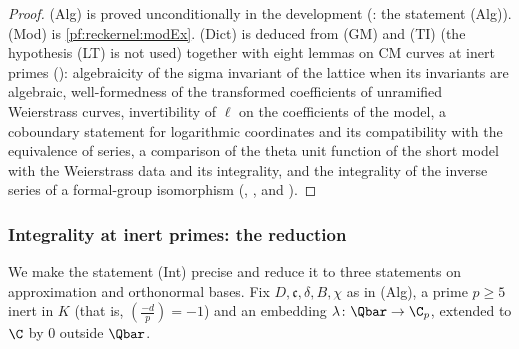 \begin{proof}
(Alg) is proved unconditionally in the development (: the statement (Alg)).
(Mod) is \cref{pf:reckernel:modEx}. (Dict) is deduced from (GM) and (TI) (the hypothesis (LT) is not used) together with eight lemmas on CM curves at
inert primes (): algebraicity of the sigma invariant of
the lattice when its invariants are algebraic, well-formedness of the transformed coefficients of unramified
Weierstrass curves, invertibility of $\ell$ on the coefficients of the model, a coboundary statement for logarithmic
coordinates and its compatibility with the equivalence of series, a comparison of the theta unit function of the short
model with the Weierstrass data and its integrality, and the integrality of the inverse series of a formal-group
isomorphism (, , and ).
\end{proof}

\subsubsection{Integrality at inert primes: the reduction}\label{pf:reckernel:sec-intred}
We make the statement (Int) precise and reduce it to three statements on approximation and orthonormal bases. Fix
$D,\mathfrak c,\delta,B,\chi$ as in (Alg), a prime $p\ge5$ inert in $K$ (that is, $\left(\frac{-d}{p}\right)=-1$) and an
embedding $\lambda\colon\Qbar\to\C_p$, extended to $\C$ by $0$ outside $\Qbar$.

